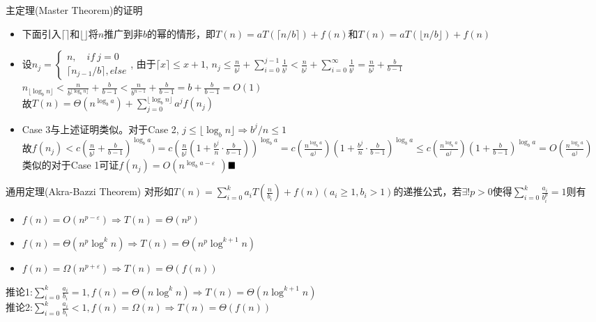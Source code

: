 \documentclass{ctexbeamer}
\begin{document}
    \begin{frame}{主定理(Master Theorem)的证明}
    \begin{itemize}
    \item 下面引入$\lceil\rceil$和$\lfloor\rfloor$将$n$推广到非$b$的幂的情形，即$T(n)=aT(\lceil n/b\rceil)+f(n)$和$T(n)=aT(\lfloor n/b\rfloor)+f(n)$
    \item 设$n_j=\begin{cases}n,\quad if\ j = 0\\ \lceil n_{j-1}/b\rceil,else\end{cases}$, 由于$\lceil x\rceil\leq x+1$, $n_j\leq \frac{n}{b^j}+\sum\limits_{i=0}^{j-1}\frac{1}{b^i}<\frac{n}{b^j}+\sum\limits_{i=0}^{\infty}\frac{1}{b^i}=\frac{n}{b^j}+\frac{b}{b-1}$\\
    $n_{\lfloor\log_bn\rfloor} < \frac{n}{b^{\lfloor\log_bn\rfloor}}+\frac{b}{b-1}<\frac{n}{b^{n-1}}+\frac{b}{b-1}=b+\frac{b}{b-1}=O(1)$\\
    故$T(n)=\Theta(n^{\log_ba})+\sum\limits_{j=0}^{\lfloor\log_bn\rfloor}a^jf(n_j)$\\
    \item Case 3与上述证明类似。对于Case 2, $j\leq \lfloor\log_bn\rfloor \Rightarrow b^j/n\leq 1$\\
    故$f(n_j)< c(\frac{n}{b^j}+\frac{b}{b-1})^{\log_ba})=c(\frac{n}{b^j}(1+\frac{b^j}{n}\cdot\frac{b}{b-1}))^{\log_ba}=c(\frac{n^{\log_ba}}{a^j})(1+\frac{b^j}{n}\cdot\frac{b}{b-1})^{\log_ba}\leq c(\frac{n^{\log_ba}}{a^j})(1+\frac{b}{b-1})^{\log_ba}=O(\frac{n^{\log_ba}}{a^j})$\\
    类似的对于Case 1可证$f(n_j)=O(n^{\log_ba-\varepsilon􏰀􏰇})$$\hfill\blacksquare$ 
    \end{itemize}
    \end{frame}

    \begin{frame}{通用定理(Akra-Bazzi Theorem)}
    对形如$T(n)=\sum\limits_{i=0}^ka_iT(\frac{n}{b_i})+f(n)(a_i\geq 1, b_i>1)$的递推公式，若$\exists!p>0$使得$\sum\limits_{i=0}^k\frac{a_i}{b_i^p}=1$则有
    \begin{itemize} 
        \setlength{\itemsep}{1em}
    \item $f(n)=O(n^{p-\varepsilon}) \Rightarrow T(n) = \Theta(n^p)$
    \item $f(n)=\Theta(n^p\log^kn) \Rightarrow T(n)=\Theta(n^p\log^{k+1}n)$
    \item $f(n)=\Omega(n^{p+\varepsilon})\Rightarrow T(n)=\Theta(f(n))$
    \end{itemize}
    推论1:\quad $\sum\limits_{i=0}^k\frac{a_i}{b_i}=1,f(n)=\Theta(n\log^k n) \Rightarrow T(n)=\Theta(n\log^{k+1} n)$\\
    推论2:\quad $\sum\limits_{i=0}^k\frac{a_i}{b_i}<1,f(n)=\Omega(n) \Rightarrow T(n)=\Theta(f(n))$
    \end{frame}
\end{document}
